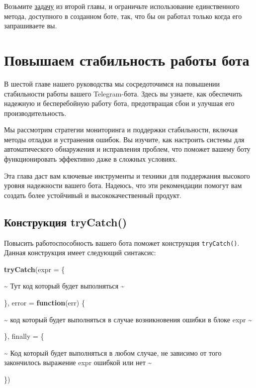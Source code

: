 \documentclass[
]{book}
\newenvironment{Shaded}{\begin{snugshade}}{\end{snugshade}}
\newcommand{\AttributeTok}[1]{\textcolor[rgb]{0.13,0.29,0.53}{#1}}
\newcommand{\ControlFlowTok}[1]{\textcolor[rgb]{0.13,0.29,0.53}{\textbf{#1}}}
\newcommand{\FunctionTok}[1]{\textcolor[rgb]{0.13,0.29,0.53}{\textbf{#1}}}
\newcommand{\NormalTok}[1]{#1}
\newcommand{\SpecialCharTok}[1]{\textcolor[rgb]{0.81,0.36,0.00}{\textbf{#1}}}
\begin{document}
Возьмите \href{-updater.html\#задания-1}{задачу} из второй главы, и ограничьте использование единственного метода, доступного в созданном боте, так, что бы он работал только когда его запрашиваете вы.

\chapter{Повышаем стабильность работы бота}\label{ux43fux43eux432ux44bux448ux430ux435ux43c-ux441ux442ux430ux431ux438ux43bux44cux43dux43eux441ux442ux44c-ux440ux430ux431ux43eux442ux44b-ux431ux43eux442ux430}

В шестой главе нашего руководства мы сосредоточимся на повышении стабильности работы вашего Telegram-бота. Здесь вы узнаете, как обеспечить надежную и бесперебойную работу бота, предотвращая сбои и улучшая его производительность.

Мы рассмотрим стратегии мониторинга и поддержки стабильности, включая методы отладки и устранения ошибок. Вы изучите, как настроить системы для автоматического обнаружения и исправления проблем, что поможет вашему боту функционировать эффективно даже в сложных условиях.

Эта глава даст вам ключевые инструменты и техники для поддержания высокого уровня надежности вашего бота. Надеюсь, что эти рекомендации помогут вам создать более устойчивый и высококачественный продукт.

\section{Конструкция tryCatch()}\label{ux43aux43eux43dux441ux442ux440ux443ux43aux446ux438ux44f-trycatch}

Повысить работоспособность вашего бота поможет конструкция \texttt{tryCatch()}. Данная конструкция имеет следующий синтаксис:

\begin{Shaded}
\begin{Highlighting}[]
\FunctionTok{tryCatch}\NormalTok{(}\AttributeTok{expr =}\NormalTok{ \{}
  
    \SpecialCharTok{\textasciitilde{}}\NormalTok{ Тут код который будет выполняться }\SpecialCharTok{\textasciitilde{}}
  
\NormalTok{\}, }
  \AttributeTok{error =} \ControlFlowTok{function}\NormalTok{(err) \{}
    
    \SpecialCharTok{\textasciitilde{}}\NormalTok{ код который будет выполняться в случае возникновения ошибки в блоке expr }\SpecialCharTok{\textasciitilde{}}
    
\NormalTok{  \}, }
  \AttributeTok{finally =}\NormalTok{ \{}
    
    \SpecialCharTok{\textasciitilde{}}\NormalTok{ Код который будет выполняться в любом случае, не зависимо от того закончилось выражение expr ошибкой или нет }\SpecialCharTok{\textasciitilde{}}
    
\NormalTok{  \})}
\end{Highlighting}
\end{Shaded}
\end{document}
